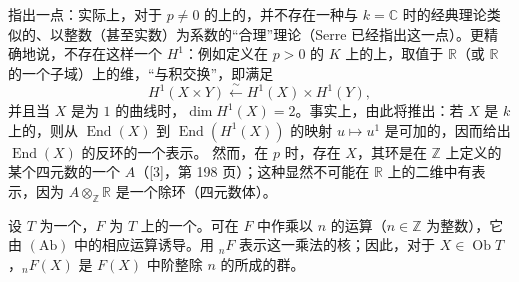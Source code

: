 指出一点：实际上，对于 $p\ne0$ 的上的，并不存在一种与 $k=\mathbb C$ 时的经典理论类似的、以整数（甚至实数）为系数的“合理”理论（Serre 已经指出这一点）。更精确地说，不存在这样一个 $H^1$：例如定义在 $p>0$ 的 $K$ 上的上，取值于 $\mathbb R$（或 $\mathbb R$ 的一个子域）上的维，“与积交换”，即满足
\[
H^1(X\times Y)\xleftarrow{\sim}H^1(X)\times H^1(Y),
\]
并且当 $X$ 是为 $1$ 的曲线时，$\dim H^1(X)=2$。事实上，由此将推出：若 $X$ 是 $k$ 上的，则从 $\operatorname{End}(X)$ 到 $\operatorname{End}(H^1(X))$ 的映射 $u\mapsto u^1$ 是可加的，因而给出 $\operatorname{End}(X)$ 的反环的一个表示。
然而，在 $p$ 时，存在 $X$，其环是在 $\mathbb Z$ 上定义的某个四元数的一个 $A$（[3]，第 198 页）；这种显然不可能在 $\mathbb R$ 上的二维中有表示，因为 $A\otimes_{\mathbb Z}\mathbb R$ 是一个除环（四元数体）。

设 $T$ 为一个，$F$ 为 $T$ 上的一个。可在 $F$ 中作乘以 $n$ 的运算（$n\in\mathbb Z$ 为整数），它由 $(\mathrm{Ab})$ 中的相应运算诱导。用 ${}_nF$ 表示这一乘法的核；因此，对于 $X\in\operatorname{Ob}T$，${}_nF(X)$ 是 $F(X)$ 中阶整除 $n$ 的所成的群。

